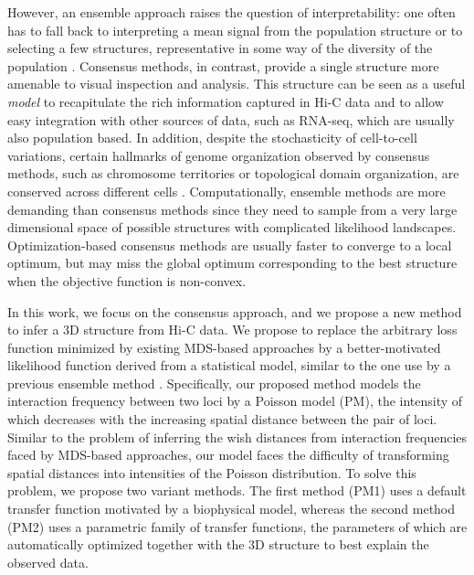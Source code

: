 However, an ensemble approach
raises the question of interpretability: one often has to fall back to
interpreting a mean signal from the population structure
\citep{kalhor:genome} or to selecting a few structures, representative
in some way of the diversity of the population
\citep{rousseau:three}.  Consensus
methods, in contrast, provide a single structure more amenable to
visual inspection and analysis.  This structure can be seen as a useful
\emph{model} to recapitulate the rich information captured in Hi-C data
and to allow easy integration with other sources of data, such as
RNA-seq, which are usually also population based. In addition, despite
the stochasticity of cell-to-cell variations, certain hallmarks
of genome organization observed by consensus methods, such as chromosome
territories or topological domain organization, are conserved across
different cells \citep{nagano:single-cell,hu:bayesian}.
Computationally, ensemble methods are more demanding than consensus methods
since they need to sample from a very large dimensional space of possible
structures with complicated likelihood landscapes. Optimization-based
consensus methods are usually faster to converge to a local optimum,
but may miss the global optimum corresponding to the best structure when
the objective function is non-convex.


In this work, we focus on the consensus approach, and we propose a new
method to infer a 3D structure from Hi-C data. We propose to
replace the arbitrary loss function minimized by existing MDS-based
approaches by a better-motivated likelihood function derived from a
statistical model, similar to the one use by a previous ensemble method \citep{hu:bayesian}.
Specifically, our proposed method models the interaction frequency between two
loci by a Poisson model (PM), the intensity of which decreases with the
increasing spatial distance between the pair of loci.
Similar to the problem of inferring the wish distances
from interaction frequencies faced by MDS-based approaches, our model
faces the difficulty of transforming spatial distances into
intensities of the Poisson distribution. To solve this problem,
we propose two variant methods. The first method (PM1) uses a default
transfer function motivated by a biophysical model, whereas the second
method (PM2) uses a parametric family of transfer functions, the parameters
of which are automatically optimized together with the 3D structure to best
explain the observed data.

